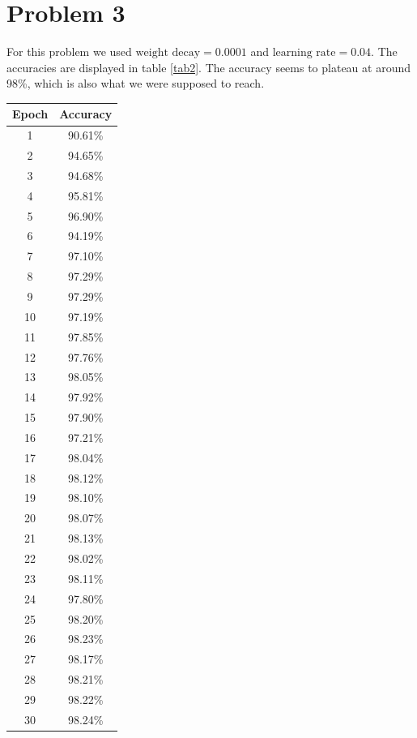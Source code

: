 \documentclass[a4paper]{article}
\begin{document}
\section*{Problem 3}
For this problem we used $\text{weight decay}  = 0.0001$ and
$\text{learning rate} = 0.04$. The accuracies are displayed in table \ref{tab2}. The accuracy seems to plateau at around 98\%, which is also what we were supposed to reach.

\begin{table}[H]
	\centering
	\begin{tabular}{|c|c|}
		\hline
		Epoch & Accuracy \\
		\hline
		1 & 90.61\% \\
		\hline
		2 & 94.65\%\\
		\hline 
		3 & 94.68\%\\
		\hline 
		4 & 95.81\%\\
		\hline 
		5 & 96.90\%\\
		\hline 
		6 & 94.19\%\\
		\hline 
		7 & 97.10\%\\
		\hline 
		8 & 97.29\%\\
		\hline 
		9 & 97.29\%\\
		\hline 
		10 & 97.19\%\\
		\hline 
		11 & 97.85\%\\
		\hline 
		12 & 97.76\%\\
		\hline 
		13 & 98.05\%\\
		\hline 
		14 & 97.92\%\\
		\hline 
		15 & 97.90\%\\
		\hline 
		16 & 97.21\%\\
		\hline 
		17 & 98.04\%\\
		\hline 
        18 & 98.12\%\\
		\hline 19 & 98.10\%\\
		\hline 20 & 98.07\%\\
		\hline 21 & 98.13\%\\
		\hline 22 & 98.02\%\\
		\hline 23 & 98.11\%\\
		\hline 24 & 97.80\%\\
		\hline 25 & 98.20\%\\
		\hline 26 & 98.23\%\\
		\hline 27 & 98.17\%\\
		\hline 28 & 98.21\%\\
		\hline 29 & 98.22\%\\
		\hline 30 & 98.24\%\\

\end{tabular}
\end{table}
\end{document}
